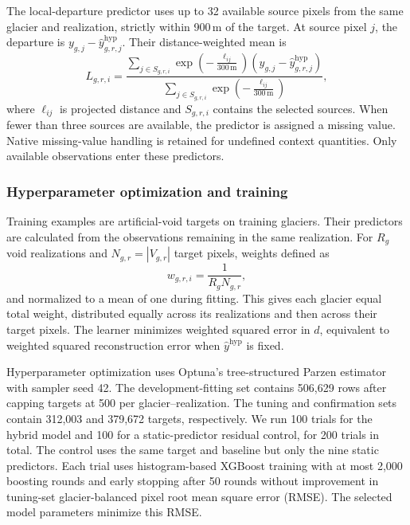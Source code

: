 \documentclass[tc,manuscript]{copernicus}
\begin{document}
The local-departure predictor uses up to 32 available source pixels from the same glacier and realization, strictly within 900\,m of the target. At source pixel $j$, the departure is $y_{g,j}-\widehat y^{\mathrm{hyp}}_{g,r,j}$. Their distance-weighted mean is
\begin{equation}
L_{g,r,i}=\frac{\sum_{j\in S_{g,r,i}}\exp\!\left(-\frac{\ell_{ij}}{300\,\mathrm m}\right)(y_{g,j}-\widehat y^{\mathrm{hyp}}_{g,r,j})}{\sum_{j\in S_{g,r,i}}\exp\!\left(-\frac{\ell_{ij}}{300\,\mathrm m}\right)},
\end{equation}
where $\ell_{ij}$ is projected distance and $S_{g,r,i}$ contains the selected sources. When fewer than three sources are available, the predictor is assigned a missing value. Native missing-value handling is retained for undefined context quantities. Only available observations enter these predictors.


\FloatBarrier

\subsubsection{Hyperparameter optimization and training}
Training examples are artificial-void targets on training glaciers. Their predictors are calculated from the observations remaining in the same realization. For $R_g$ void realizations and $N_{g,r}=|V_{g,r}|$ target pixels, weights defined as
\begin{equation}
w_{g,r,i}=\frac{1}{R_gN_{g,r}},
\end{equation}
and normalized to a mean of one during fitting. This gives each glacier equal total weight, distributed equally across its realizations and then across their target pixels. The learner minimizes weighted squared error in $d$, equivalent to weighted squared reconstruction error when $\widehat y^{\mathrm{hyp}}$ is fixed.

Hyperparameter optimization uses Optuna's tree-structured Parzen estimator \citep{akiba2019} with sampler seed 42. The development-fitting set contains 506,629 rows after capping targets at 500 per glacier--realization. The tuning and confirmation sets contain 312,003 and 379,672 targets, respectively. We run 100 trials for the hybrid model and 100 for a static-predictor residual control, for 200 trials in total. The control uses the same target and baseline but only the nine static predictors. Each trial uses histogram-based XGBoost training with at most 2,000 boosting rounds and early stopping after 50 rounds without improvement in tuning-set glacier-balanced pixel root mean square error (RMSE). The selected model parameters minimize this RMSE.
\end{document}
